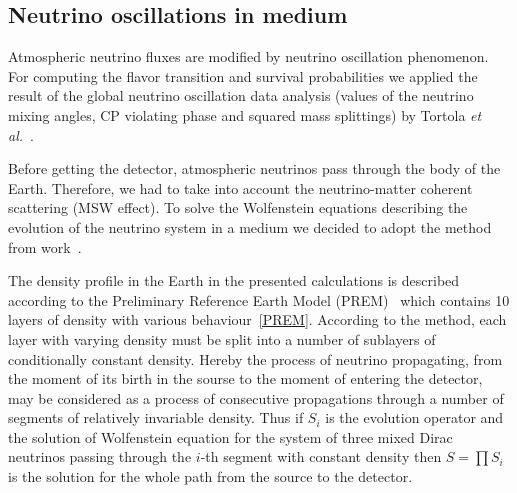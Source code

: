 \subsection{Neutrino oscillations in medium}
Atmospheric neutrino fluxes are modified by neutrino oscillation phenomenon. For computing the flavor transition and survival probabilities we applied the result of the global neutrino oscillation data analysis (values of the neutrino mixing angles, CP violating phase and squared mass splittings) by Tortola \textit{et al.}~\cite{Tortola:2012te}.

Before getting the detector, atmospheric neutrinos pass through the body of the Earth. Therefore, we had to take into account the neutrino-matter coherent scattering (MSW effect). To solve the Wolfenstein equations describing the evolution of the neutrino system in a medium we decided to adopt the method from work~\cite{Naumov:2001ci}.

The density profile in the Earth in the presented calculations is described according to the Preliminary Reference Earth Model (PREM)~\cite{Dziewonski:1981xy} which contains 10 layers of density with various behaviour~\ref{PREM}. According to the method, each layer with varying density must be split into a number of sublayers of conditionally constant density. Hereby the process of neutrino propagating, from the moment of its birth in the sourse to the moment of entering the detector, may be considered as a process of consecutive propagations through a number of segments of relatively invariable density. Thus if ${S_{i}}$ is the evolution operator and the solution of Wolfenstein equation for the system of three mixed Dirac neutrinos passing through the $i$-th segment with constant density then $S=\prod{S_{i}}$ is the solution for the whole path from the source to the detector.

